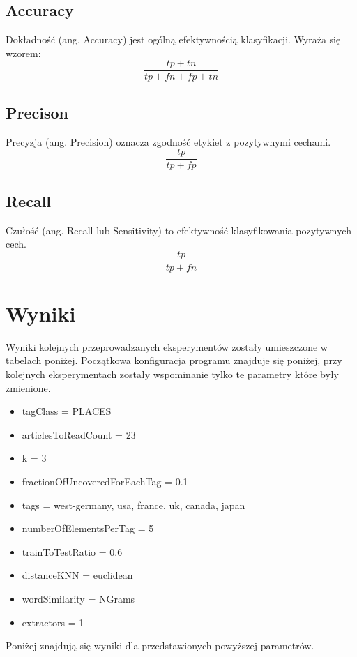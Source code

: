 \documentclass{classrep}
\begin{document}
\subsection{Accuracy}
Dokładność (ang. Accuracy) jest ogólną efektywnością klasyfikacji. Wyraża się wzorem:
$$ \frac{tp+tn}{tp+fn+fp+tn} $$

\subsection{Precison}
Precyzja (ang. Precision) oznacza zgodność etykiet z pozytywnymi cechami.
$$ \frac{tp}{tp+fp} $$

\subsection{Recall}
Czułość (ang. Recall lub Sensitivity) to efektywność klasyfikowania pozytywnych cech. 
$$ \frac{tp}{tp+fn} $$

\section{Wyniki}
Wyniki kolejnych przeprowadzanych eksperymentów zostały umieszczone w tabelach poniżej. Początkowa konfiguracja programu znajduje się poniżej, przy kolejnych eksperymentach zostały wspominanie tylko te parametry które były zmienione.
\begin{itemize}
	\item tagClass = PLACES
	\item articlesToReadCount = 23
	\item k = 3
	\item fractionOfUncoveredForEachTag = 0.1
	\item tags = west-germany, usa, france, uk, canada, japan
	\item numberOfElementsPerTag = 5
	\item trainToTestRatio = 0.6
	\item distanceKNN = euclidean
	\item wordSimilarity = NGrams
	\item extractors = 1
\end{itemize}
Poniżej znajdują się wyniki dla przedstawionych powyższej parametrów.\\
\end{document}
